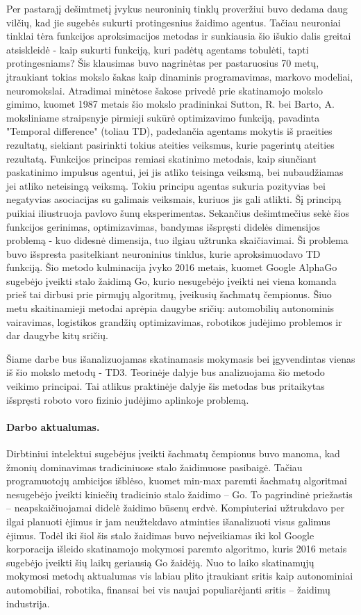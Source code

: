 \documentclass[a4paper, 12pt]{article}
\begin{document}
Per pastarajį dešimtmetį įvykus neuroninių tinklų proveržiui buvo dedama daug vilčių, kad jie sugebės sukurti protingesnius žaidimo agentus. Tačiau neuroniai tinklai tėra funkcijos aproksimacijos metodas ir sunkiausia šio išukio dalis greitai atsiskleidė - kaip sukurti funkciją, kuri padėtų agentams tobulėti, tapti protingesniams? Šis klausimas buvo nagrinėtas per pastaruosius 70 metų, įtraukiant tokias mokslo šakas kaip dinaminis programavimas, markovo modeliai, neuromokslai. Atradimai minėtose šakose privedė prie skatinamojo mokslo gimimo, kuomet 1987 metais šio mokslo pradininkai Sutton, R. bei Barto, A. moksliniame straipsnyje \cite{TDSutton} pirmieji sukūrė optimizavimo funkciją, pavadinta "Temporal difference" (toliau TD), padedančia agentams mokytis iš praeities rezultatų, siekiant pasirinkti tokius ateities veiksmus, kurie pagerintų ateities rezultatą. Funkcijos principas remiasi skatinimo metodais, kaip siunčiant paskatinimo impulsus agentui, jei jis atliko teisinga veiksmą, bei nubaudžiamas jei atliko neteisingą veiksmą. Tokiu principu agentas sukuria pozityvias bei negatyvias asociacijas su galimais veiksmais, kuriuos jis gali atlikti. Šį principą puikiai iliustruoja pavlovo šunų eksperimentas. Sekančius dešimtmečius sekė šios funkcijos gerinimas, optimizavimas, bandymas išspręsti didelės dimensijos problemą - kuo didesnė dimensija, tuo ilgiau užtrunka skaičiavimai. Ši problema buvo išspresta pasitelkiant neuroninius tinklus, kurie aproksimuodavo TD funkciją. Šio metodo kulminacija įvyko 2016 metais, kuomet Google AlphaGo sugebėjo įveikti stalo žaidimą Go, kurio nesugebėjo įveikti nei viena komanda prieš tai dirbusi prie pirmųjų algoritmų, įveikusių šachmatų čempionus. Šiuo metu skaitinamieji metodai aprėpia daugybe sričių: automobilių autonominis vairavimas, logistikos grandžių optimizavimas, robotikos judėjimo problemos ir dar daugybe kitų sričių. 

Šiame darbe bus išanalizuojamas skatinamasis mokymasis bei įgyvendintas vienas iš šio mokslo metodų - TD3. Teorinėje dalyje bus analizuojama šio metodo veikimo principai. Tai atlikus praktinėje dalyje šis metodas bus pritaikytas išspręsti roboto voro fizinio judėjimo aplinkoje problemą.



%
\paragraph{Darbo aktualumas.} Dirbtiniui intelektui sugebėjus įveikti šachmatų čempionus buvo manoma, kad žmonių dominavimas tradiciniuose stalo žaidimuose pasibaigė. Tačiau programuotojų ambicijos išblėso, kuomet min-max paremti šachmatų algoritmai nesugebėjo įveikti kiniečių tradicinio stalo žaidimo – Go. To pagrindinė priežastis – neapskaičiuojamai didelė žaidimo būsenų erdvė. Kompiuteriai užtrukdavo per ilgai planuoti ėjimus ir jam neužtekdavo atminties išanalizuoti visus galimus ėjimus. Todėl iki šiol šis stalo žaidimas buvo neįveikiamas iki kol Google korporacija išleido skatinamojo mokymosi paremto algoritmo, kuris 2016 metais sugebėjo įveikti šių laikų geriausią Go žaidėją. Nuo to laiko skatinamųjų mokymosi metodų aktualumas vis labiau plito įtraukiant sritis kaip autonominiai automobiliai, robotika, finansai bei vis naujai populiarėjanti sritis – žaidimų industrija. 
%
\end{document}
